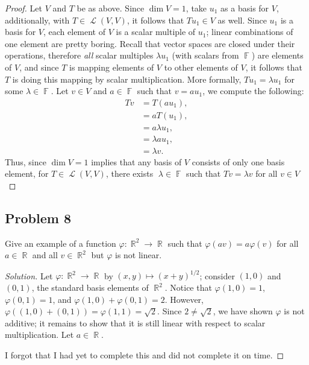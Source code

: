 \documentclass[letterpaper, 12pt]{amsart}
\DeclareMathOperator{\R}{\mathbb{R}}
\DeclareMathOperator{\F}{\mathbb{F}}
\DeclareMathOperator{\Ell}{\mathscr{L}}
\theoremstyle{definition}  %
\begin{document}
		\begin{proof}
		Let $V$ and $T$ be as above.
		Since $\dim V = 1$, take $u_{1}$ as a basis for $V$, additionally, with $T \in \Ell(V,V)$, it follows that $Tu_{1} \in V$ as well.
		Since $u_{1}$ is a basis for $V$, each element of $V$ is a scalar multiple of $u_{1}$; linear combinations of one element are pretty boring.
		Recall that vector spaces are closed under their operations, therefore \textit{all} scalar multiples $\lambda u_{1}$ (with scalars from $\F$) are elements of $V$, and since $T$ is mapping elements of $V$ to other elements of $V$, it follows that $T$ is doing this mapping by scalar multiplication.
		More formally, $Tu_{1} = \lambda u_{1}$ for some $\lambda \in \F$.
		Let $v \in V$ and $a \in \F$ such that $v = a u_{1}$, we compute the following:
			\begin{align*}
				Tv &= T(au_{1}), \\
				&= a T(u_{1}), \\
				&= a \lambda u_{1}, \\
				&= \lambda a u_{1}, \\
				&= \lambda v.
			\end{align*}
		Thus, since $\dim V = 1$ implies that any basis of $V$ consists of only one basis element, for $T \in \Ell(V,V)$, there exists 􏰀$\lambda \in \F$ such that $Tv = \lambda v$ for all $v \in V$
		\end{proof}

		\subsection*{Problem 8}
		Give an example of a function $\varphi : \R^{2} \to \R$ such that $\varphi(av) = a\varphi(v)$ for all $a \in \R$ and all $v \in \R^{2}$ but $\varphi$ is not linear.

		\begin{proof}[Solution]
		Let $\varphi : \R^{2} \to \R$ by $(x,y) \mapsto (x + y)^{1/2}$; consider $(1,0)$ and $(0,1)$, the standard basis elements of $\R^{2}$.
		Notice that $\varphi(1,0) = 1$, \ $\varphi(0,1) = 1$, and $\varphi(1,0) + \varphi(0,1) = 2$.
		However, $\varphi((1,0) + (0,1)) = \varphi(1,1) = \sqrt{2}$.
		Since $2 \neq \sqrt{2}$, we have shown $\varphi$ is not additive; it remains to show that it is still linear with respect to scalar multiplication.
		Let $a \in \R$.

		I forgot that I had yet to complete this and did not complete it on time.
		\end{proof}
\end{document}
